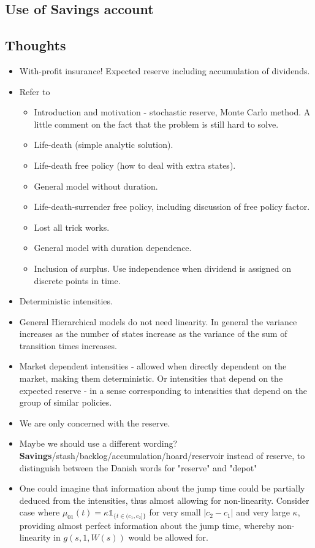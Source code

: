 \documentclass[12pt]{article}
\newcommand{\indic}[1]{\mathds{1}_{ \{ #1 \} }}
\theoremstyle{my_thm}
\begin{document}
\subsection{Use of Savings account}

\subsection{Thoughts}
\begin{itemize}
\item With-profit insurance! Expected reserve including accumulation of dividends.
\item Refer to \citet{Norberg}
\begin{itemize}
\item Introduction and motivation - stochastic reserve, Monte Carlo method. A little comment on the fact that the problem is still hard to solve.
\item Life-death (simple analytic solution).
\item Life-death free policy (how to deal with extra states).
\item General model without duration.
\item Life-death-surrender free policy, including discussion of free policy factor.
\item Lost all trick works.
\item General model with duration dependence.
\item Inclusion of surplus. Use independence when dividend is assigned on discrete points in time.
\end{itemize}
\item Deterministic intensities.
\item General Hierarchical models do not need linearity. In general the variance increases as the number of states increase as the variance of the sum of transition times increases.
\item Market dependent intensities - allowed when directly dependent on the market, making them deterministic. Or intensities that depend on the expected reserve - in a sense corresponding to intensities that depend on the group of similar policies.
\item We are only concerned with the reserve.
\item Maybe we should use a different wording? \textbf{Savings}/stash/backlog/accumulation/hoard/reservoir instead of reserve, to distinguish between the Danish words for "reserve" and "depot"
\item One could imagine that information about the jump time could be partially deduced from the intensities, thus almost allowing for non-linearity. Consider case where $\mu_{01}(t)= \kappa \indic{t \in (c_1,c_2]}$ for very small $|c_2-c_1|$ and very large $\kappa$, providing almost perfect information about the jump time, whereby non-linearity in $g(s,1,W(s))$ would be allowed for.

\end{itemize}
\end{document}
